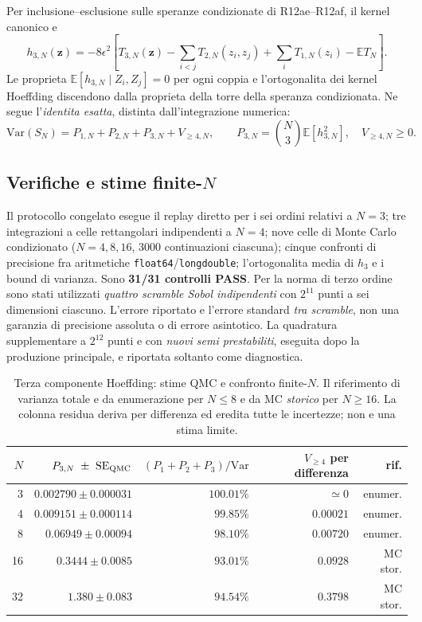 \documentclass[11pt,a4paper]{article}
\begin{document}
Per inclusione--esclusione sulle speranze condizionate di R12ae--R12af, il kernel canonico e
\begin{equation}
 \boxed{h_{3,N}(\mathbf z)=-8\epsilon^2\left[T_{3,N}(\mathbf z)-\sum_{i<j}T_{2,N}(z_i,z_j)
 +\sum_i T_{1,N}(z_i)-\mathbb E T_N\right].}
 \label{eq:r12ag_h3}
\end{equation}
Le proprieta $\mathbb E[h_{3,N}\mid Z_i,Z_j]=0$ per ogni coppia e l'ortogonalita dei kernel Hoeffding discendono dalla proprieta della torre della speranza condizionata. Ne segue l'\emph{identita esatta}, distinta dall'integrazione numerica:
\begin{equation}
 \boxed{\mathrm{Var}(S_N)=P_{1,N}+P_{2,N}+P_{3,N}+V_{\ge4,N},\qquad
 P_{3,N}=\binom N3\mathbb E[h_{3,N}^{2}],\quad V_{\ge4,N}\ge0.}
 \label{eq:r12ag_decomp}
\end{equation}

\subsection{Verifiche e stime finite-$N$}

Il protocollo congelato esegue il replay diretto per i sei ordini relativi a $N=3$; tre integrazioni a celle rettangolari indipendenti a $N=4$; nove celle di Monte Carlo condizionato ($N=4,8,16$, $3000$ continuazioni ciascuna); cinque confronti di precisione fra aritmetiche \texttt{float64}/\texttt{longdouble}; l'ortogonalita media di $h_3$ e i bound di varianza. Sono \textbf{31/31 controlli PASS}. Per la norma di terzo ordine sono stati utilizzati \emph{quattro scramble Sobol indipendenti} con $2^{11}$ punti a sei dimensioni ciascuno. L'errore riportato e l'errore standard \emph{tra scramble}, non una garanzia di precisione assoluta o di errore asintotico. La quadratura supplementare a $2^{12}$ punti e con \emph{nuovi semi prestabiliti}, eseguita dopo la produzione principale, e riportata soltanto come diagnostica.

\begin{table}[htbp]
\centering\small
\caption{Terza componente Hoeffding: stime QMC e confronto finite-$N$. Il riferimento di varianza totale e da enumerazione per $N\le8$ e da MC \emph{storico} per $N\ge16$. La colonna residua deriva per differenza ed eredita tutte le incertezze; non e una stima limite.}
\label{tab:r12ag_p3}
\begin{tabular}{r r r r r}
\toprule
$N$ & $P_{3,N}\ \pm\ \mathrm{SE}_{\rm QMC}$ & $(P_1+P_2+P_3)/\mathrm{Var}$ & $V_{\ge4}$ per differenza & rif.\\
\midrule
3  & $0.002790\pm0.000031$ & $100.01\%$ & $\simeq 0$ & enumer.\\
4  & $0.009151\pm0.000114$ & $99.85\%$ & $0.00021$ & enumer.\\
8  & $0.06949\pm0.00094$ & $98.10\%$ & $0.00720$ & enumer.\\
16 & $0.3444\pm0.0085$ & $93.01\%$ & $0.0928$ & MC stor.\\
32 & $1.380\pm0.083$ & $94.54\%$ & $0.3798$ & MC stor.\\
\bottomrule
\end{tabular}
\end{table}
\end{document}
